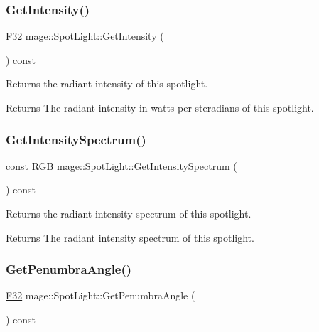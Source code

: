 \subsubsection{\texorpdfstring{Get\+Intensity()}{GetIntensity()}}
{\footnotesize\ttfamily \hyperlink{namespacemage_aa97e833b45f06d60a0a9c4fc22ae02c0}{F32} mage\+::\+Spot\+Light\+::\+Get\+Intensity (\begin{DoxyParamCaption}{ }\end{DoxyParamCaption}) const\hspace{0.3cm}{\ttfamily [noexcept]}}

Returns the radiant intensity of this spotlight.

\begin{DoxyReturn}{Returns}
The radiant intensity in watts per steradians of this spotlight. 
\end{DoxyReturn}
\hypertarget{classmage_1_1_spot_light_ad05d3abab9285f8c25ac42ee446d6e05}{}\label{classmage_1_1_spot_light_ad05d3abab9285f8c25ac42ee446d6e05} 
\subsubsection{\texorpdfstring{Get\+Intensity\+Spectrum()}{GetIntensitySpectrum()}}
{\footnotesize\ttfamily const \hyperlink{structmage_1_1_r_g_b}{R\+GB} mage\+::\+Spot\+Light\+::\+Get\+Intensity\+Spectrum (\begin{DoxyParamCaption}{ }\end{DoxyParamCaption}) const\hspace{0.3cm}{\ttfamily [noexcept]}}

Returns the radiant intensity spectrum of this spotlight.

\begin{DoxyReturn}{Returns}
The radiant intensity spectrum of this spotlight. 
\end{DoxyReturn}
\hypertarget{classmage_1_1_spot_light_a37d61501193f5ed4ecefe4015595ed89}{}\label{classmage_1_1_spot_light_a37d61501193f5ed4ecefe4015595ed89} 
\subsubsection{\texorpdfstring{Get\+Penumbra\+Angle()}{GetPenumbraAngle()}}
{\footnotesize\ttfamily \hyperlink{namespacemage_aa97e833b45f06d60a0a9c4fc22ae02c0}{F32} mage\+::\+Spot\+Light\+::\+Get\+Penumbra\+Angle (\begin{DoxyParamCaption}{ }\end{DoxyParamCaption}) const\hspace{0.3cm}{\ttfamily [noexcept]}}

